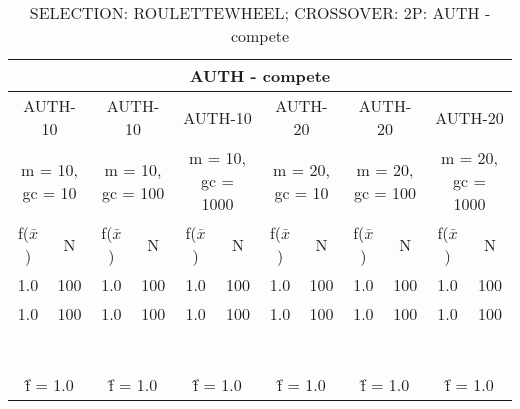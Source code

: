 \begin{table}[H]
	\centering
	\caption{SELECTION: ROULETTEWHEEL; CROSSOVER: 2P: AUTH - compete}
	\begin{adjustbox}{width=1\textwidth}
		\begin{tabular}{ |c|c||c|c||c|c||c|c||c|c||c|c| }
			\hline
			\multicolumn{12}{|c|}{AUTH - compete} \\
			\hline
			\multicolumn{2}{|c||}{AUTH-10} & \multicolumn{2}{c||}{AUTH-10} & \multicolumn{2}{c||}{AUTH-10} & \multicolumn{2}{c||}{AUTH-20} & \multicolumn{2}{c||}{AUTH-20} & \multicolumn{2}{c|}{AUTH-20}\\
			\hline
			\multicolumn{2}{|c||}{m = 10, gc = 10} & \multicolumn{2}{c||}{m = 10, gc = 100} & \multicolumn{2}{c||}{m = 10, gc = 1000} & \multicolumn{2}{c||}{m = 20, gc = 10} & \multicolumn{2}{c||}{m = 20, gc = 100} & \multicolumn{2}{c|}{m = 20, gc = 1000}\\
			\hline
			f($\bar{x}$) & N & f($\bar{x}$) & N & f($\bar{x}$) & N & f($\bar{x}$) & N & f($\bar{x}$) & N & f($\bar{x}$) & N\\
			\hline
			\hline
			1.0 & 100 & 1.0 & 100 & 1.0 & 100 & 1.0 & 100 & 1.0 & 100 & 1.0 & 100\\
			\hline
			1.0 & 100 & 1.0 & 100 & 1.0 & 100 & 1.0 & 100 & 1.0 & 100 & 1.0 & 100\\
			&   &   &   &   &   &   &   &   &   &   &  \\
			&   &   &   &   &   &   &   &   &   &   &  \\
			&   &   &   &   &   &   &   &   &   &   &  \\
			&   &   &   &   &   &   &   &   &   &   &  \\
			&   &   &   &   &   &   &   &   &   &   &  \\
			&   &   &   &   &   &   &   &   &   &   &  \\
			&   &   &   &   &   &   &   &   &   &   &  \\
			\hline
			\multicolumn{2}{|c||}{\^{f} = 1.0} & \multicolumn{2}{c||}{\^{f} = 1.0} & \multicolumn{2}{c||}{\^{f} = 1.0} & \multicolumn{2}{c||}{\^{f} = 1.0} & \multicolumn{2}{c||}{\^{f} = 1.0} & \multicolumn{2}{c|}{\^{f} = 1.0}\\
			\hline
		\end{tabular}
	\end{adjustbox}
\end{table}
